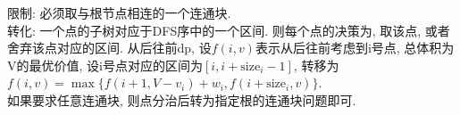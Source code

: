 \noindent
限制: 必须取与根节点相连的一个连通块.\\
转化: 一个点的子树对应于DFS序中的一个区间. 则每个点的决策为, 取该点, 或者舍弃该点对应的区间. 从后往前dp, 设$f(i, v)$表示从后往前考虑到i号点, 总体积为V的最优价值, 设i号点对应的区间为$[i,i+\mathrm{size}_i-1]$, 转移为$f(i, v)=\max\{f(i+1, V-v_i)+w_i, f(i+\mathrm{size}_i, v)\}$.\\
如果要求任意连通块, 则点分治后转为指定根的连通块问题即可.

